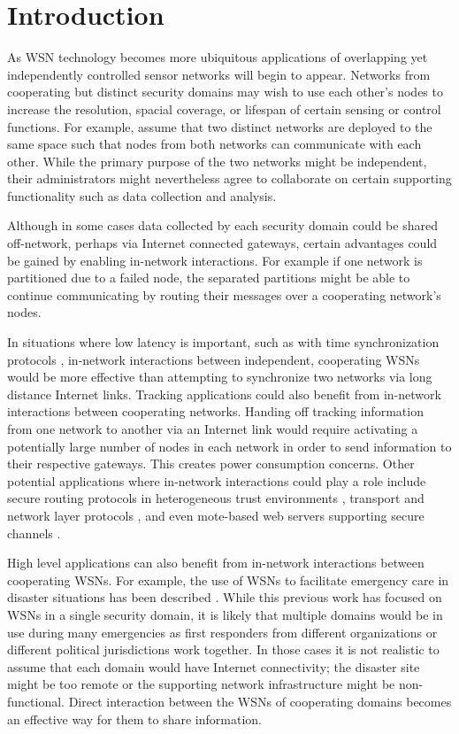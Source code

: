 \section{Introduction}
\label{section-intro}

As WSN technology becomes more ubiquitous applications of overlapping yet independently
controlled sensor networks will begin to appear. Networks from cooperating but distinct security
domains may wish to use each other's nodes to increase the resolution, spacial coverage, or
lifespan of certain sensing or control functions. For example, assume that two distinct networks
are deployed to the same space such that nodes from both networks can communicate with each
other. While the primary purpose of the two networks might be independent, their administrators
might nevertheless agree to collaborate on certain supporting functionality such as data
collection and analysis.

Although in some cases data collected by each security domain could be shared off-network,
perhaps via Internet connected gateways, certain advantages could be gained by enabling
in-network interactions. For example if one network is partitioned due to a failed node, the
separated partitions might be able to continue communicating by routing their messages over a
cooperating network's nodes.

In situations where low latency is important, such as with time synchronization protocols
\cite{ganeriwal-kumar-srivastava-2003}, in-network interactions between independent, cooperating
WSNs would be more effective than attempting to synchronize two networks via long distance
Internet links. Tracking applications \cite{brooks-ramanathan-sayeed-2003} could also benefit
from in-network interactions between cooperating networks. Handing off tracking information from
one network to another via an Internet link would require activating a potentially large number
of nodes in each network in order to send information to their respective gateways. This creates
power consumption concerns. Other potential applications where in-network interactions could
play a role include secure routing protocols in heterogeneous trust environments
\cite{senroute-ahnj03}, transport and network layer protocols \cite{perillo-heinzelman-2005},
and even mote-based web servers supporting secure channels \cite{1049776}.

High level applications can also benefit from in-network interactions between cooperating WSNs.
For example, the use of WSNs to facilitate emergency care in disaster situations has been
described \cite{citeulike:4460555,1038146}. While this previous work has focused on WSNs in a
single security domain, it is likely that multiple domains would be in use during many
emergencies as first responders from different organizations or different political
jurisdictions work together. In those cases it is not realistic to assume that each domain would
have Internet connectivity; the disaster site might be too remote or the supporting network
infrastructure might be non-functional. Direct interaction between the WSNs of cooperating
domains becomes an effective way for them to share information.

